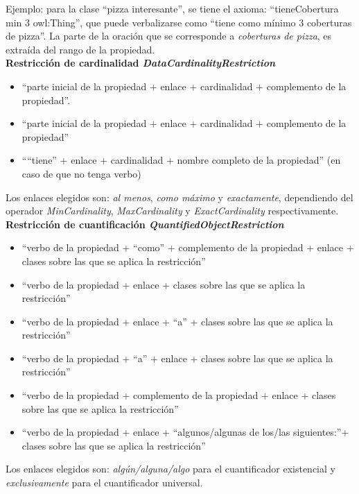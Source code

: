 Ejemplo: para la clase ``pizza interesante'', se tiene el axioma: ``tieneCobertura min 3 owl:Thing'', que puede verbalizarse como ``tiene como mínimo 3 coberturas de pizza''. La parte de la oración que se corresponde a \emph{coberturas de pizza}, es extraída del rango de la propiedad.
\\

{\bf Restricción de cardinalidad \emph{DataCardinalityRestriction}}

\begin{itemize}
    \item ``parte inicial de la propiedad + enlace + cardinalidad + complemento de la propiedad''.

    \item ``parte inicial de la propiedad + enlace + cardinalidad + complemento de la propiedad''

    \item ````tiene'' + enlace + cardinalidad + nombre completo de la propiedad'' (en caso de que no tenga verbo)
\end{itemize}

Los enlaces elegidos son: \emph{al menos}, \emph{como máximo} y \emph{exactamente}, dependiendo del operador \emph{MinCardinality}, \emph{MaxCardinality} y \emph{ExactCardinality} respectivamente.
\\

{\bf Restricción de cuantificación \emph{QuantifiedObjectRestriction}}
\begin{itemize}
    \item ``verbo de la propiedad + ``como'' + complemento de la propiedad + enlace + clases sobre las que se aplica la restricción''
    \item ``verbo de la propiedad + enlace + clases sobre las que se aplica la restricción''
    \item ``verbo de la propiedad + enlace + ``a'' + clases sobre las que se aplica la restricción''
    \item ``verbo de la propiedad + ``a'' + enlace + clases sobre las que se aplica la restricción''
    \item ``verbo de la propiedad + complemento de la propiedad + enlace + clases sobre las que se aplica la restricción''
    \item ``verbo de la propiedad + enlace + ``algunos/algunas de los/las siguientes:''+ clases sobre las que se aplica la restricción''
\end{itemize}
Los enlaces elegidos son: \emph{algún/alguna/algo} para el cuantificador existencial y \emph{exclusivamente} para el cuantificador universal.

